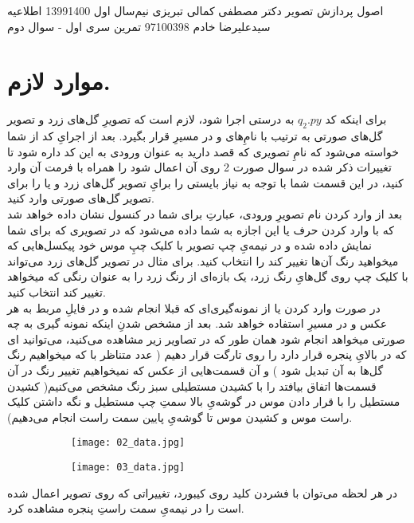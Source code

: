 \documentclass[a4paper,12pt]{article}
\begin{document}
\handout
{اصول پردازش تصویر}
{دکتر مصطفی کمالی تبریزی}
{نیم‌سال اول 1399\lr{-}1400}
{اطلاعیه}
{سیدعلیرضا خادم}
{97100398}
 {تمرین سری اول - سوال دوم}
\section*{موارد لازم.}\label{n}
برای اینکه کد 
$ q_2.py $
به درستی اجرا شود، لازم است که تصویرِ گل‌های زرد و تصویر گل‌های صورتی به ترتیب با نامِ‌های
و
در مسیرِ 
قرار بگیرد. بعد از اجرایِ کد از شما خواسته می‌شود که نامِ تصویری که قصد دارید به عنوان ورودی به این کد داره شود تا تغییرات ذکر شده در سوال صورت 2 روی آن اعمال شود را همراه با فرمت آن وارد کنید، در این قسمت شما با توجه به نیاز بایستی 
را برایِ تصویر گل‌های زرد و یا
را برای تصویر گل‌های صورتی وارد کنید.\\ بعد از وارد کردن نام تصویرِ ورودی،  عبارتِ 
برای شما در کنسول نشان داده خواهد شد که با وارد کردن حرف 
یا 
این اجازه به شما داده می‌شود که در تصویری که برای شما نمایش داده شده و در نیمه‌یِ چپ تصویر با کلیک چپِ موس خود پیکسل‌هایی که میخواهید رنگ آن‌ها تغییر کند را انتخاب کنید. برای مثال در تصویر گل‌های زرد می‌تواند با کلیک چپ روی گل‌هایِ رنگ زرد، یک بازه‌ای از رنگ زرد را به عنوان رنگی که میخواهد تغییر کند انتخاب کنید.\\
در صورت وارد کردن 
 یا 
 از نمونه‌گیری‌ای که قبلا انجام شده و در فایلِ مربط به هر عکس و در مسیرِ
 استفاده خواهد شد.
 بعد از مشخص شدنِ اینکه نمونه گیری به چه صورتی میخواهد انجام شود همان طور که در تصاویر زیر مشاهده می‌کنید، می‌توانید
 ای که در بالایِ پنجره قرار دارد را روی 
 تارگت قرار دهیم ( عدد متناظر با 
که میخواهیم رنگ گل‌ها به آن
تبدیل شود
 ) 
 و آن قسمت‌هایی از عکس که نمیخواهیم تغییر رنگ در آن قسمت‌ها اتفاق بیافتد را با کشیدن مستطیلی سبز رنگ مشخص می‌کنیم( کشیدن مستطیل را با قرار دادن موس در گوشه‌یِ بالا سمتِ چپ مستطیل و نگه داشتن کلیک راست موس و کشیدن موس تا گوشه‌یِ پایین سمت راست انجام می‌دهیم).
 \begin{figure}
	\centering
 	\begin{subfigure}{0.9\textwidth}
 		\centering
 		\texttt{[image: 02\_data.jpg]}
 	\end{subfigure}
 	\vspace{1cm}
 	\begin{subfigure}{0.9\textwidth}
 		\centering
		\texttt{[image: 03\_data.jpg]}
	\end{subfigure}
 \end{figure}
در هر لحظه می‌توان با فشردن کلید
روی کیبورد، تغییراتی که روی تصویر اعمال شده است را در نیمه‌یِ سمت راستِ پنجره مشاهده کرد.
\end{document}
